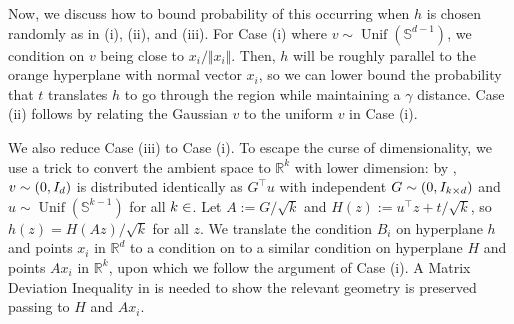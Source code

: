\documentclass[aoap]{imsart}
\numberwithin{equation}{section}
\theoremstyle{definition}
\theoremstyle{remark}
\newcommand{\N}{\mathbb{N}}
\numberwithin{equation}{section}
\renewcommand{\S}{\mathbb{S}}
\newcommand{\0}{\mathbf{0}}
\newcommand{\1}{\mathbf{1}}
\renewcommand{\S}{\mathbb{S}}
\DeclareMathOperator{\Unif}{Unif}
\let \N \relax
\DeclareMathOperator{\N}{N}
\numberwithin{equation}{section}
\begin{document}
Now, we discuss how to bound probability of this occurring when $h$ is chosen randomly as in (i), (ii), and (iii). For Case (i) where $v\sim \Unif(\S^{d-1})$, we condition on $v$ being close to $x_i/\Vert x_i\Vert$. Then, $h$ will be roughly parallel to the orange hyperplane with normal vector $x_i$, so we can lower bound the probability that $t$ translates $h$ to go through the region while maintaining a $\gamma$ distance. Case (ii) follows by relating the Gaussian $v$ to the uniform $v$ in Case (i).

We also reduce Case (iii) to Case (i). To escape the curse of dimensionality, we use a trick to convert the ambient space to $\mathbb{R}^k$ with lower dimension: by \cite[Proof of Theorem 1.6]{dirksen2021separation}, $v\sim \N(0, I_d)$ is distributed identically as $G^{\intercal}u$ with independent $G\sim \N(0, I_{k\times d})$ and $u\sim \Unif(\S^{k-1})$ for all $k\in\N$. Let $A:=G/\sqrt{k}$ and $H(z):=u^{\intercal}z+t/\sqrt{k}$, so $h(z) = {H(Az)}/{\sqrt{k}}$ for all $z$. We translate the condition $B_i$ on hyperplane $h$ and points $x_i$ in $\mathbb{R}^d$ to a condition on to a similar condition on hyperplane $H$ and points $Ax_i$ in $\mathbb{R}^k$, upon which we follow the argument of Case (i). A Matrix Deviation Inequality in \cite[Exercise 9.1.8]{Ver18} is needed to show the relevant geometry is preserved passing to $H$ and $Ax_i$. 
\end{document}
